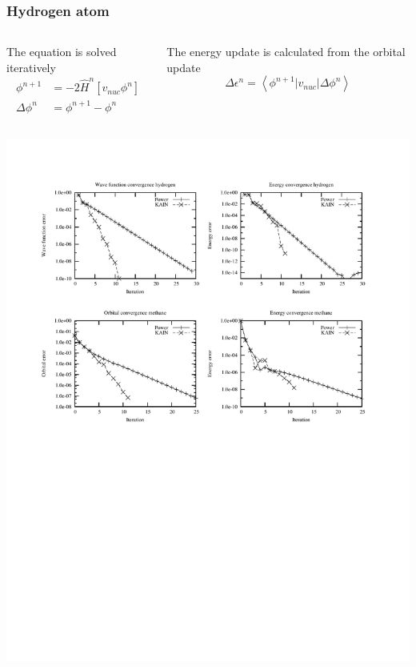 \documentclass[mathserif]{beamer}
\begin{document}
\begin{frame}
    \frametitle{Hydrogen atom}
    \begin{columns}
    \begin{column}{.50\textwidth}
    \centering
    The equation is solved iteratively
    \begin{align}
	\nonumber
	\phi^{n+1} &= -2\hat{H}^n\left[v_{nuc}\phi^n\right]\\
	\nonumber
	\Delta\phi^n &= \phi^{n+1} - \phi^n
    \end{align}
    \end{column}
    \begin{column}{.50\textwidth}
    \centering
    The energy update is calculated from the orbital update
    \begin{equation}
	\nonumber
	\Delta \epsilon^n = \left<\phi^{n+1}|v_{nuc}|\Delta\phi^n\right>
    \end{equation}
    \end{column}
    \end{columns}    
    \begin{center}
	\includegraphics[scale=0.6, clip, viewport = 50 550 540 730]{figures/convergence.pdf}
    \end{center}
\end{frame}
\end{document}
